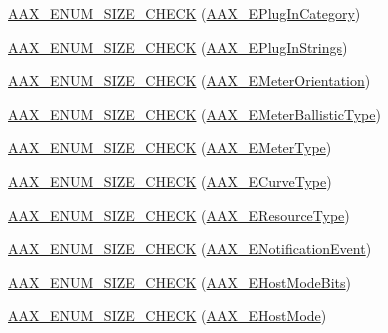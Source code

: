 \begin{DoxyCompactItemize}
\item 
\mbox{\hyperlink{a00491_af03b09e4b8f907df552ebec1e370a135}{A\+A\+X\+\_\+\+E\+N\+U\+M\+\_\+\+S\+I\+Z\+E\+\_\+\+C\+H\+E\+CK}} (\mbox{\hyperlink{a00491_aef9637518fb1ac0e2f403444c73aba4a}{A\+A\+X\+\_\+\+E\+Plug\+In\+Category}})
\item 
\mbox{\hyperlink{a00491_a4b8945e01f3337265dcee5f454bc5857}{A\+A\+X\+\_\+\+E\+N\+U\+M\+\_\+\+S\+I\+Z\+E\+\_\+\+C\+H\+E\+CK}} (\mbox{\hyperlink{a00491_a86f7310877399d9d4d2ea4863d472476}{A\+A\+X\+\_\+\+E\+Plug\+In\+Strings}})
\item 
\mbox{\hyperlink{a00491_aa9225c8cfef25d0acf0926a642b5218e}{A\+A\+X\+\_\+\+E\+N\+U\+M\+\_\+\+S\+I\+Z\+E\+\_\+\+C\+H\+E\+CK}} (\mbox{\hyperlink{a00491_af260f0f9a6bff0f7bfd3200b2947c96b}{A\+A\+X\+\_\+\+E\+Meter\+Orientation}})
\item 
\mbox{\hyperlink{a00491_a53dfd5cc131b9b12740186bbbb732b7e}{A\+A\+X\+\_\+\+E\+N\+U\+M\+\_\+\+S\+I\+Z\+E\+\_\+\+C\+H\+E\+CK}} (\mbox{\hyperlink{a00491_a9aaedbe356691c4e4584fa7ccdbcc776}{A\+A\+X\+\_\+\+E\+Meter\+Ballistic\+Type}})
\item 
\mbox{\hyperlink{a00491_addacef5d33544a5cdbe9d58b63605545}{A\+A\+X\+\_\+\+E\+N\+U\+M\+\_\+\+S\+I\+Z\+E\+\_\+\+C\+H\+E\+CK}} (\mbox{\hyperlink{a00491_a590815545eaf0d3be0bb8f656fe2a761}{A\+A\+X\+\_\+\+E\+Meter\+Type}})
\item 
\mbox{\hyperlink{a00491_ab8ce307b2b85eb0d5de17813eda29077}{A\+A\+X\+\_\+\+E\+N\+U\+M\+\_\+\+S\+I\+Z\+E\+\_\+\+C\+H\+E\+CK}} (\mbox{\hyperlink{a00812_ga59c73d8f51c5c55d54a728eff39da884}{A\+A\+X\+\_\+\+E\+Curve\+Type}})
\item 
\mbox{\hyperlink{a00491_a04d4c1951e42ae74c94bb99454ac28fd}{A\+A\+X\+\_\+\+E\+N\+U\+M\+\_\+\+S\+I\+Z\+E\+\_\+\+C\+H\+E\+CK}} (\mbox{\hyperlink{a00491_ae2805e88175d975589153a04e42898bb}{A\+A\+X\+\_\+\+E\+Resource\+Type}})
\item 
\mbox{\hyperlink{a00491_ae90559e18b44edddec74b4595009c81b}{A\+A\+X\+\_\+\+E\+N\+U\+M\+\_\+\+S\+I\+Z\+E\+\_\+\+C\+H\+E\+CK}} (\mbox{\hyperlink{a00491_afab5ea2cfd731fc8f163b6caa685406e}{A\+A\+X\+\_\+\+E\+Notification\+Event}})
\item 
\mbox{\hyperlink{a00491_ac166b575bff4f47816a531a4b06fa3d2}{A\+A\+X\+\_\+\+E\+N\+U\+M\+\_\+\+S\+I\+Z\+E\+\_\+\+C\+H\+E\+CK}} (\mbox{\hyperlink{a00491_aa3c8056a6ce601cc3367cb7d4478e9da}{A\+A\+X\+\_\+\+E\+Host\+Mode\+Bits}})
\item 
\mbox{\hyperlink{a00491_a6b565d001b7c6478b5d1154446dc1397}{A\+A\+X\+\_\+\+E\+N\+U\+M\+\_\+\+S\+I\+Z\+E\+\_\+\+C\+H\+E\+CK}} (\mbox{\hyperlink{a00491_af7d77416967955e258539694870f395a}{A\+A\+X\+\_\+\+E\+Host\+Mode}})

\end{DoxyCompactItemize}
